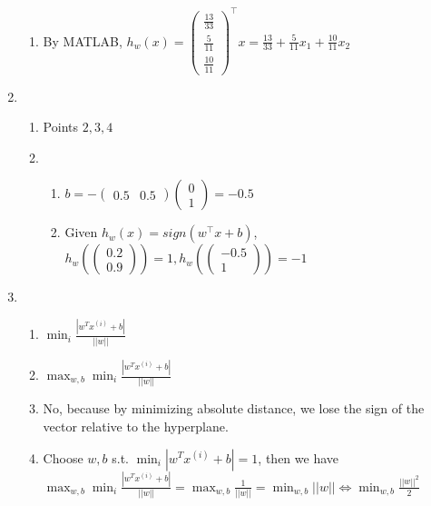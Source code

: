 \documentclass[12pt, a4paper]{article}
\begin{document}
\begin{enumerate}[\Alph*.]
\begin{enumerate}[\arabic*.]
      \item By MATLAB, $h_w(x) = \left(\begin{array}{c} \frac{13}{33}\\ \frac{5}{11}\\ \frac{10}{11} \end{array}\right)^\top x = \frac{13}{33} + \frac{5}{11}x_1 + \frac{10}{11}x_2$
    \end{enumerate}

  \item 
    \begin{enumerate}[\arabic*.]
      \item Points $2, 3, 4$

      \item 
        \begin{enumerate}[(\alph*)]
          \item $b = -\left(\begin{array}{cc} 0.5 & 0.5 \end{array}\right) \left(\begin{array}{c} 0\\ 1 \end{array}\right) = -0.5$ 

          \item Given $h_w(x) = sign(w^\top x + b)$, $h_w(\left(\begin{array}{c} 0.2\\ 0.9 \end{array}\right) ) = 1, h_w(\left(\begin{array}{c} -0.5\\ 1 \end{array}\right)) = -1$
        \end{enumerate}
    \end{enumerate}

  \item 
    \begin{enumerate}[\arabic*.]
      \item $\displaystyle\min_i \frac{|w^Tx^{(i)}+ b|}{||w||}$ 
      \item $\displaystyle\max_{w,b}\min_i \frac{|w^Tx^{(i)}+ b|}{||w||}$ 
      \item No, because by minimizing absolute distance, we lose the sign of the vector relative to the hyperplane.
      \item Choose $w, b$ s.t. $\displaystyle \min_i |w^Tx^{(i)} + b| = 1$, then we have $\displaystyle\max_{w,b}\min_i \frac{|w^Tx^{(i)}+ b|}{||w||} = \max_{w,b} \frac{1}{||w||} = \min_{w,b} ||w|| \iff \min_{w,b}\frac{||w||^2}{2}$ 
    \end{enumerate}
\end{enumerate}
\end{document}
